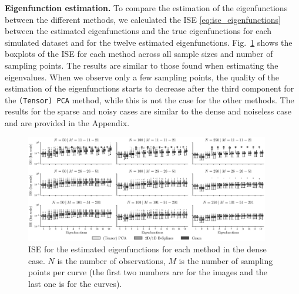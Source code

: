 \documentclass[times,sort&compress,3p]{elsarticle}
\theoremstyle{plain}%
\theoremstyle{definition}
\newenvironment{results}[1][]{\noindent \textbf{#1} \rmfamily}{\medskip}
\begin{document}
\begin{results}[Eigenfunction estimation.]
To compare the estimation of the eigenfunctions between the different methods, we calculated the ISE \eqref{eq:ise_eigenfunctions} between the estimated eigenfunctions and the true eigenfunctions for each simulated dataset and for the twelve estimated eigenfunctions. Fig.~\ref{fig:ise_mfd_1d} shows the boxplots of the ISE for each method across all sample sizes and number of sampling points. The results are similar to those found when estimating the eigenvalues. When we observe only a few sampling points, the quality of the estimation of the eigenfunctions starts to decrease after the third component for the \texttt{(Tensor) PCA} method, while this is not the case for the other methods. The results for the sparse and noisy cases are similar to the dense and noiseless case and are provided in the Appendix.
\begin{figure}
     \centering
    \includegraphics[width=0.95\textwidth]{ISE}
    \caption{ISE for the estimated eigenfunctions for each method in the dense case. $N$ is the number of observations, $M$ is the number of sampling points per curve (the first two numbers are for the images and the last one is for the curves).}
    \label{fig:ise_mfd_1d}
\end{figure}
\end{results}
\end{document}
